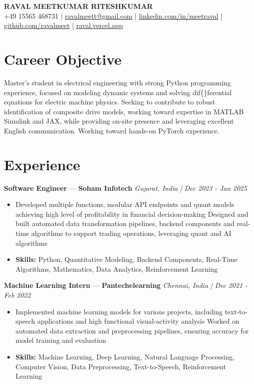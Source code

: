 \documentclass[a4paper,10pt]{article}
\begin{document}
\begin{center}
  {\Large\bfseries RAVAL MEETKUMAR RITESHKUMAR}\\[2pt]
  {\small +49 15565 468731 \;|\; \href{mailto:ravalmeett@gmail.com}{ravalmeett@gmail.com} \;|\; \href{https://www.linkedin.com/in/meetraval/}{linkedin.com/in/meetraval} \;|\; \href{https://github.com/ravalmeet}{github.com/ravalmeet} \;|\; \href{https://raval.vercel.app/}{raval.vercel.app}}
\end{center}
\vspace{-3pt}

\section*{Career Objective}
Master's student in electrical engineering with strong Python programming experience, focused on modeling dynamic systems and solving dif\{\}ferential equations for electric machine physics. Seeking to contribute to robust identification of composite drive models, working toward expertise in MATLAB Simulink and JAX, while providing on-site presence and leveraging excellent English communication. Working toward hands-on PyTorch experience.\par

\section*{Experience}
\textbf{Software Engineer} — \textbf{Soham Infotech} \hfill \textit{Gujarat, India \;|\; Dec 2023 - Jan 2025}\par
\vspace{1pt}
\begin{itemize}
  \item Developed multiple functions, modular API endpoints and quant models achieving high level of profitability in financial decision-making Designed and built automated data transformation pipelines, backend components and real-time algorithms to support trading operations, leveraging quant and AI algorithms
  \item \textbf{Skills:} Python, Quantitative Modeling, Backend Components, Real-Time Algorithms, Mathematics, Data Analytics, Reinforcement Learning
\end{itemize}
\vspace{3pt}
\textbf{Machine Learning Intern} — \textbf{Pantechelearning} \hfill \textit{Chennai, India \;|\; Dec 2021 - Feb 2022}\par
\vspace{1pt}
\begin{itemize}
  \item Implemented machine learning models for various projects, including text-to-speech applications and high functional visual-activity analysis Worked on automated data extraction and preprocessing pipelines, ensuring accuracy for model training and evaluation
  \item \textbf{Skills:} Machine Learning, Deep Learning, Natural Language Processing, Computer Vision, Data Preprocessing, Text-to-Speech, Reinforcement Learning
\end{itemize}
\end{document}
